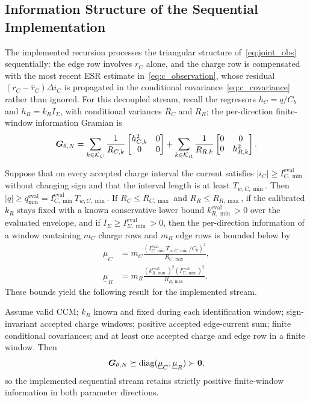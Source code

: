 \subsection{Information Structure of the Sequential Implementation}

The implemented recursion processes the triangular structure of~\eqref{eq:joint_obs} sequentially: the edge row involves $r_C$ alone, and the charge row is compensated with the most recent ESR estimate in~\eqref{eq:c_observation}, whose residual $(r_C-\hat r_C)\Delta i_C$ is propagated in the conditional covariance~\eqref{eq:c_covariance} rather than ignored. For this decoupled stream, recall the regressors $h_C=q/C_b$ and $h_R=k_RI_\Sigma$, with conditional variances $R_C$ and $R_R$; the per-direction finite-window information Gramian is
\begin{equation}
\bm{G}_{\theta,N}=
\sum_{k\in\mathcal K_C}\frac{1}{R_{C,k}}
\begin{bmatrix}h_{C,k}^2&0\\0&0\end{bmatrix}
+
\sum_{k\in\mathcal K_R}\frac{1}{R_{R,k}}
\begin{bmatrix}0&0\\0&h_{R,k}^2\end{bmatrix}.
\label{eq:gramian}
\end{equation}

Suppose that on every accepted charge interval the current satisfies $|i_C|\ge I_{C,\min}^{\mathrm{eval}}$ without changing sign and that the interval length is at least $T_{w,C,\min}$. Then $|q|\ge q_{\min}^{\mathrm{eval}}=I_{C,\min}^{\mathrm{eval}}T_{w,C,\min}$. If $R_C\le R_{C,\max}$ and $R_R\le R_{R,\max}$, if the calibrated $k_R$ stays fixed with a known conservative lower bound $k_{R,\min}^{\mathrm{eval}}>0$ over the evaluated envelope, and if $I_\Sigma\ge I_{\Sigma,\min}^{\mathrm{eval}}>0$, then the per-direction information of a window containing $m_C$ charge rows and $m_R$ edge rows is bounded below by
\begin{align}
\underline\mu_C & =m_C\frac{(I_{C,\min}^{\mathrm{eval}}T_{w,C,\min}/C_b)^2}{R_{C,\max}},
\label{eq:mu_c}\\
\underline\mu_R & =m_R\frac{(k_{R,\min}^{\mathrm{eval}})^2(I_{\Sigma,\min}^{\mathrm{eval}})^2}{R_{R,\max}}.
\label{eq:mu_r}
\end{align}
These bounds yield the following result for the implemented stream.

\begin{proposition}
\label{prop:identifiability}
Assume valid CCM; $k_R$ known and fixed during each identification window; sign-invariant accepted charge windows; positive accepted edge-current sum; finite conditional covariances; and at least one accepted charge and edge row in a finite window. Then
\begin{equation}
\bm{G}_{\theta,N}\succeq
\operatorname{diag}(\underline\mu_C,\underline\mu_R)\succ\bm{0},
\label{eq:positive_gramian}
\end{equation}
so the implemented sequential stream retains strictly positive finite-window information in both parameter directions.
\end{proposition}

